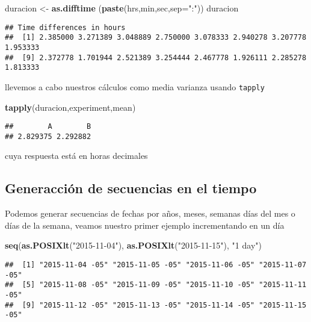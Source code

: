 \documentclass[]{article}
\newenvironment{Shaded}{\begin{snugshade}}{\end{snugshade}}
\newcommand{\KeywordTok}[1]{\textcolor[rgb]{0.13,0.29,0.53}{\textbf{#1}}}
\newcommand{\DataTypeTok}[1]{\textcolor[rgb]{0.13,0.29,0.53}{#1}}
\newcommand{\StringTok}[1]{\textcolor[rgb]{0.31,0.60,0.02}{#1}}
\newcommand{\NormalTok}[1]{#1}
\begin{document}
\begin{Shaded}
\begin{Highlighting}[]
\NormalTok{duracion <-}\StringTok{ }\KeywordTok{as.difftime}\NormalTok{ (}\KeywordTok{paste}\NormalTok{(hrs,min,sec,}\DataTypeTok{sep=}\StringTok{":"}\NormalTok{))}
\NormalTok{duracion}
\end{Highlighting}
\end{Shaded}

\begin{verbatim}
## Time differences in hours
##  [1] 2.385000 3.271389 3.048889 2.750000 3.078333 2.940278 3.207778 1.953333
##  [9] 2.372778 1.701944 2.521389 3.254444 2.467778 1.926111 2.285278 1.813333
\end{verbatim}

llevemos a cabo nuestros cálculos como media varianza usando
\texttt{tapply}

\begin{Shaded}
\begin{Highlighting}[]
\KeywordTok{tapply}\NormalTok{(duracion,experiment,mean)}
\end{Highlighting}
\end{Shaded}

\begin{verbatim}
##        A        B 
## 2.829375 2.292882
\end{verbatim}

cuya respuesta está en horas decimales

\subsection{Generacción de secuencias en el
tiempo}\label{generacciuxf3n-de-secuencias-en-el-tiempo}

Podemos generar secuencias de fechas por años, meses, semanas días del
mes o días de la semana, veamos nuestro primer ejemplo incrementando en
un día

\begin{Shaded}
\begin{Highlighting}[]
\KeywordTok{seq}\NormalTok{(}\KeywordTok{as.POSIXlt}\NormalTok{(}\StringTok{"2015-11-04"}\NormalTok{), }\KeywordTok{as.POSIXlt}\NormalTok{(}\StringTok{"2015-11-15"}\NormalTok{), }\StringTok{"1 day"}\NormalTok{)}
\end{Highlighting}
\end{Shaded}

\begin{verbatim}
##  [1] "2015-11-04 -05" "2015-11-05 -05" "2015-11-06 -05" "2015-11-07 -05"
##  [5] "2015-11-08 -05" "2015-11-09 -05" "2015-11-10 -05" "2015-11-11 -05"
##  [9] "2015-11-12 -05" "2015-11-13 -05" "2015-11-14 -05" "2015-11-15 -05"
\end{verbatim}
\end{document}
